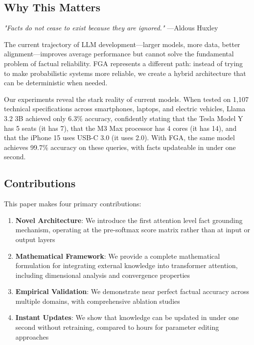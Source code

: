\documentclass[11pt, a4paper]{article}
\theoremstyle{definition}
\begin{document}
\subsection{Why This Matters}

\textit{"Facts do not cease to exist because they are ignored."} —Aldous Huxley

The current trajectory of LLM development—larger models, more data, better alignment—improves average performance but cannot solve the fundamental problem of factual reliability. FGA represents a different path: instead of trying to make probabilistic systems more reliable, we create a hybrid architecture that can be deterministic when needed.

Our experiments reveal the stark reality of current models. When tested on 1,107 technical specifications across smartphones, laptops, and electric vehicles, Llama 3.2 3B achieved only 6.3\% accuracy, confidently stating that the Tesla Model Y has 5 seats (it has 7), that the M3 Max processor has 4 cores (it has 14), and that the iPhone 15 uses USB-C 3.0 (it uses 2.0). With FGA, the same model achieves 99.7\% accuracy on these queries, with facts updateable in under one second.

\subsection{Contributions}

This paper makes four primary contributions:

\begin{enumerate}
    \item \textbf{Novel Architecture}: We introduce the first attention level fact grounding mechanism, operating at the pre-softmax score matrix rather than at input or output layers
    
    \item \textbf{Mathematical Framework}: We provide a complete mathematical formulation for integrating external knowledge into transformer attention, including dimensional analysis and convergence properties
    
    \item \textbf{Empirical Validation}: We demonstrate near perfect factual accuracy across multiple domains, with comprehensive ablation studies
    
    \item \textbf{Instant Updates}: We show that knowledge can be updated in under one second without retraining, compared to hours for parameter editing approaches
\end{enumerate}
\end{document}
